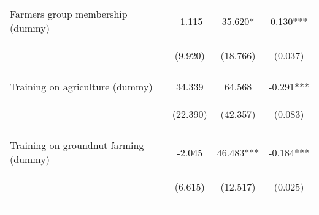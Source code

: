 \begin{center}
\begin{tabular}{lccc}
Farmers group membership (dummy) & -1.115 & 35.620* & 0.130*** \\
 & \begin{footnotesize}(9.920)\end{footnotesize} & \begin{footnotesize}(18.766)\end{footnotesize} & \begin{footnotesize}(0.037)\end{footnotesize} \\
\vspace{4pt} & \begin{footnotesize}[0.910]\end{footnotesize} & \begin{footnotesize}[0.058]\end{footnotesize} & \begin{footnotesize}[0.000]\end{footnotesize} \\
Training on agriculture (dummy) & 34.339 & 64.568 & -0.291*** \\
 & \begin{footnotesize}(22.390)\end{footnotesize} & \begin{footnotesize}(42.357)\end{footnotesize} & \begin{footnotesize}(0.083)\end{footnotesize} \\
\vspace{4pt} & \begin{footnotesize}[0.125]\end{footnotesize} & \begin{footnotesize}[0.127]\end{footnotesize} & \begin{footnotesize}[0.000]\end{footnotesize} \\
Training on groundnut farming (dummy) & -2.045 & 46.483*** & -0.184*** \\
 & \begin{footnotesize}(6.615)\end{footnotesize} & \begin{footnotesize}(12.517)\end{footnotesize} & \begin{footnotesize}(0.025)\end{footnotesize} \\
\vspace{4pt} & \begin{footnotesize}[0.757]\end{footnotesize} & \begin{footnotesize}[0.000]\end{footnotesize} & \begin{footnotesize}[0.000]\end{footnotesize} \\

\end{tabular}
\end{center}
